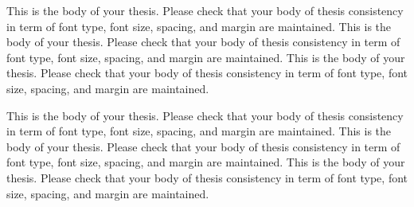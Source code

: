 This is the body of your thesis. Please check that your body of thesis consistency in term of font type, font size, spacing, and margin are maintained. This is the body of your thesis. Please check that your body of thesis consistency in term of font type, font size, spacing, and margin are maintained. This is the body of your thesis. Please check that your body of thesis consistency in term of font type, font size, spacing, and margin are maintained.

This is the body of your thesis. Please check that your body of thesis consistency in term of font type, font size, spacing, and margin are maintained. This is the body of your thesis. Please check that your body of thesis consistency in term of font type, font size, spacing, and margin are maintained. This is the body of your thesis. Please check that your body of thesis consistency in term of font type, font size, spacing, and margin are maintained.
